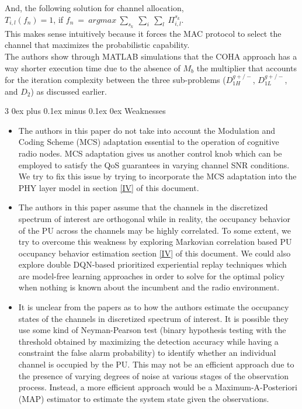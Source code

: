 \documentclass[12pt, draftcls, onecolumn]{IEEEtran}
\makeatletter
\def\subsubsection{\@startsection{subsubsection}%
                                 {3}%
                                 {\z@}%
                                 {0ex plus 0.1ex minus 0.1ex}%
                                 {0ex}%
                                 {\normalfont\normalsize\bfseries}}%
\makeatother
\begin{document}
\begin{itemize}
    And, the following solution for channel allocation,
    \\$T_{i,l}(f_n) = 1$, if $f_n\ =\ argmax\ \sum_{s_k}\ \sum_{i}\ \sum_{l}\ \Pi_{i,l}^{s_k}$.
    \\This makes sense intuitively because it forces the MAC protocol to select the channel that maximizes the probabilistic capability.
    \\The authors show through MATLAB simulations that the COHA approach has a way shorter execution time due to the absence of $M_b$ the multiplier that accounts for the iteration complexity between the three sub-problems ($D_{1H}^{g+/-}$, $D_{1L}^{g+/-}$, and $D_2$) as discussed earlier.
\end{itemize}
\subsubsection{Weaknesses}
\begin{itemize}
    \item The authors in this paper do not take into account the Modulation and Coding Scheme (MCS) adaptation essential to the operation of cognitive radio nodes. MCS adaptation gives us another control knob which can be employed to satisfy the QoS guarantees in varying channel SNR conditions. We try to fix this issue by trying to incorporate the MCS adaptation into the PHY layer model in section \ref{IV} of this document.
    \item The authors in this paper assume that the channels in the discretized spectrum of interest are orthogonal while in reality, the occupancy behavior of the PU across the channels may be highly correlated. To some extent, we try to overcome this weakness by exploring Markovian correlation based PU occupancy behavior estimation section \ref{IV} of this document. We could also explore double DQN-based prioritized experiential replay techniques which are model-free learning approaches in order to solve for the optimal policy when nothing is known about the incumbent and the radio environment.
    \item It is unclear from the papers as to how the authors estimate the occupancy states of the channels in discretized spectrum of interest. It is possible they use some kind of Neyman-Pearson test (binary hypothesis testing with the threshold obtained by maximizing the detection accuracy while having a constraint the false alarm probability) to identify whether an individual channel is occupied by the PU. This may not be an efficient approach due to the presence of varying degrees of noise at various stages of the observation process. Instead, a more efficient approach would be a Maximum-A-Posteriori (MAP) estimator to estimate the system state given the observations.
\end{itemize}
\end{document}
